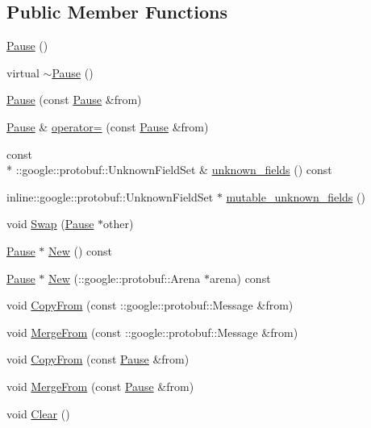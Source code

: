\subsection*{Public Member Functions}
\begin{DoxyCompactItemize}
\item 
\hyperlink{class_pause_a924c770ec375aad161483040dd1f9638}{Pause} ()
\item 
virtual \hyperlink{class_pause_a6a564235e87326133c14069be196eeac}{$\sim$\-Pause} ()
\item 
\hyperlink{class_pause_a6d9f3c3c86804f1018e41981fce7a5de}{Pause} (const \hyperlink{class_pause}{Pause} \&from)
\item 
\hyperlink{class_pause}{Pause} \& \hyperlink{class_pause_a2d65a031f1dcdb67e4536b22c8ab414f}{operator=} (const \hyperlink{class_pause}{Pause} \&from)
\item 
const \\*
\-::google\-::protobuf\-::\-Unknown\-Field\-Set \& \hyperlink{class_pause_a5b5c631de45d3cd394c8e6ce35319bca}{unknown\-\_\-fields} () const 
\item 
inline\-::google\-::protobuf\-::\-Unknown\-Field\-Set $\ast$ \hyperlink{class_pause_a7e4d5b5e01a70b9eb30e839898efcac2}{mutable\-\_\-unknown\-\_\-fields} ()
\item 
void \hyperlink{class_pause_ad587734aa5f89360a446f7524e72c713}{Swap} (\hyperlink{class_pause}{Pause} $\ast$other)
\item 
\hyperlink{class_pause}{Pause} $\ast$ \hyperlink{class_pause_ac7a15b915ffd6d9871010ea21dda6af7}{New} () const 
\item 
\hyperlink{class_pause}{Pause} $\ast$ \hyperlink{class_pause_abc7f5cc2e44167593126dc7e02c6a281}{New} (\-::google\-::protobuf\-::\-Arena $\ast$arena) const 
\item 
void \hyperlink{class_pause_ac3b45e0a8a112543955e9dec70720c33}{Copy\-From} (const \-::google\-::protobuf\-::\-Message \&from)
\item 
void \hyperlink{class_pause_a4d7a23a24b2199df9e8af317cd9efd52}{Merge\-From} (const \-::google\-::protobuf\-::\-Message \&from)
\item 
void \hyperlink{class_pause_a8a4f7ea801fa755ad33ec4c503e8c36e}{Copy\-From} (const \hyperlink{class_pause}{Pause} \&from)
\item 
void \hyperlink{class_pause_a0363eac7eeaeb5bee0d8be630581aa94}{Merge\-From} (const \hyperlink{class_pause}{Pause} \&from)
\item 
void \hyperlink{class_pause_a17c998beccec414a6293b7e83281b3a2}{Clear} ()

\end{DoxyCompactItemize}
